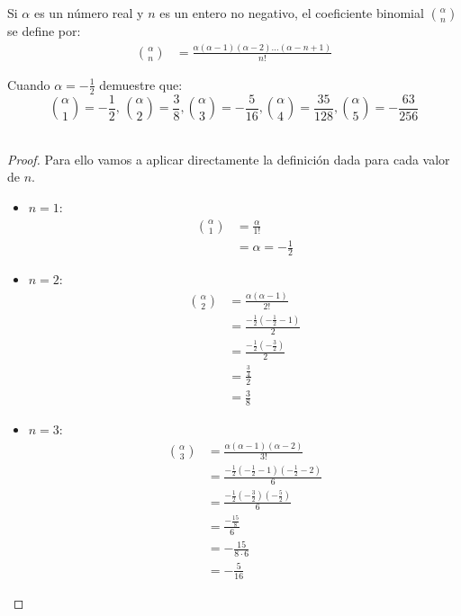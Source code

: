 \documentclass[../main.tex]{subfiles}
\begin{document}
Si $\alpha$ es un número real y $n$ es un entero no negativo, el coeficiente binomial $\binom{\alpha}{n}$ se define por:
\begin{align*}
    \binom{\alpha}{n} &= \frac{\alpha (\alpha - 1)(\alpha - 2) \dots (\alpha - n + 1)}{n!}
\end{align*}
\begin{partes}
    \parte Cuando $\alpha = -\frac{1}{2}$ demuestre que:
    $$\binom{\alpha}{1} = -\frac{1}{2},\, \binom{\alpha}{2} = \frac{3}{8}, \binom{\alpha}{3} = -\frac{5}{16}, \binom{\alpha}{4} = \frac{35}{128}, \binom{\alpha}{5} = -\frac{63}{256}$$\\

    \begin{proof}
        Para ello vamos a aplicar directamente la definición dada para cada valor de $n$.
        \begin{itemize}
            \item $n = 1$:
            \begin{align*}
                \binom{\alpha}{1} &= \frac{\alpha}{1!} \\
                &= \alpha = -\frac{1}{2}
            \end{align*}
            \item $n = 2$:
            \begin{align*}
                \binom{\alpha}{2} &= \frac{\alpha (\alpha-1)}{2!}\\
                &= \frac{-\frac{1}{2} \left(-\frac{1}{2} - 1\right)}{2}\\
                &= \frac{-\frac{1}{2} \left(-\frac{3}{2}\right)}{2}\\
                &= \frac{\frac{3}{4}}{2}\\
                &= \frac{3}{8}
            \end{align*}
            \item $n = 3$:
            \begin{align*}
                \binom{\alpha}{3} &= \frac{\alpha (\alpha-1) (\alpha-2)}{3!}\\
                &= \frac{-\frac{1}{2} \left(-\frac{1}{2}-1\right)\left(-\frac{1}{2}-2\right)}{6}\\
                &= \frac{-\frac{1}{2} \left(-\frac{3}{2}\right)\left(-\frac{5}{2}\right)}{6}\\
                &= \frac{-\frac{15}{8}}{6}\\
                &= -\frac{15}{8 \cdot 6}\\
                &= -\frac{5}{16}

\end{align*}
\end{itemize}
\end{proof}
\end{partes}
\end{document}
